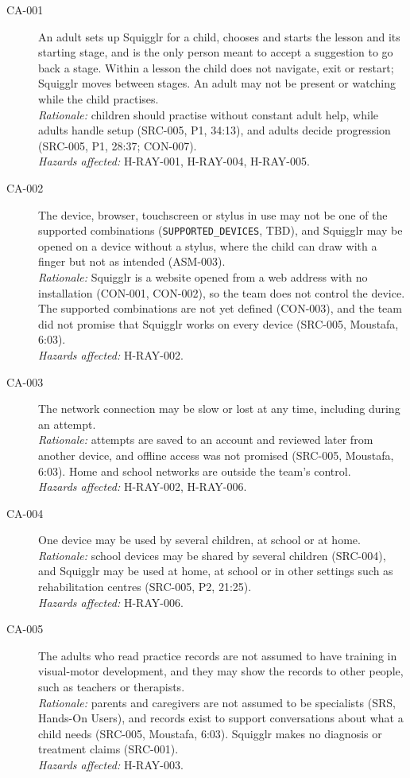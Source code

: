 \documentclass{article}
\begin{document}
\begin{description}
\item[CA-001] An adult sets up Squigglr for a child, chooses and starts the
lesson and its starting stage, and is the only person meant to accept a
suggestion to go back a stage. Within a lesson the child does not navigate, exit
or restart; Squigglr moves between stages. An adult may not be present or
watching while the child practises.\\
\emph{Rationale:} children should practise without constant adult help, while
adults handle setup (SRC-005, P1, 34:13), and adults decide progression
(SRC-005, P1, 28:37; CON-007).\\
\emph{Hazards affected:} H-RAY-001, H-RAY-004, H-RAY-005.

\item[CA-002] The device, browser, touchscreen or stylus in use may not be one
of the supported combinations (\texttt{SUPPORTED\_DEVICES}, TBD), and Squigglr
may be opened on a device without a stylus, where the child can draw with a
finger but not as intended (ASM-003).\\
\emph{Rationale:} Squigglr is a website opened from a web address with no
installation (CON-001, CON-002), so the team does not control the device. The
supported combinations are not yet defined (CON-003), and the team did not
promise that Squigglr works on every device (SRC-005, Moustafa, 6:03).\\
\emph{Hazards affected:} H-RAY-002.

\item[CA-003] The network connection may be slow or lost at any time, including
during an attempt.\\
\emph{Rationale:} attempts are saved to an account and reviewed later from
another device, and offline access was not promised (SRC-005, Moustafa, 6:03).
Home and school networks are outside the team's control.\\
\emph{Hazards affected:} H-RAY-002, H-RAY-006.

\item[CA-004] One device may be used by several children, at school or at
home.\\
\emph{Rationale:} school devices may be shared by several children (SRC-004),
and Squigglr may be used at home, at school or in other settings such as
rehabilitation centres (SRC-005, P2, 21:25).\\
\emph{Hazards affected:} H-RAY-006.

\item[CA-005] The adults who read practice records are not assumed to have
training in visual-motor development, and they may show the records to other
people, such as teachers or therapists.\\
\emph{Rationale:} parents and caregivers are not assumed to be specialists (SRS,
Hands-On Users), and records exist to support conversations about what a child
needs (SRC-005, Moustafa, 6:03). Squigglr makes no diagnosis or treatment claims
(SRC-001).\\
\emph{Hazards affected:} H-RAY-003.


\end{description}
\end{document}
